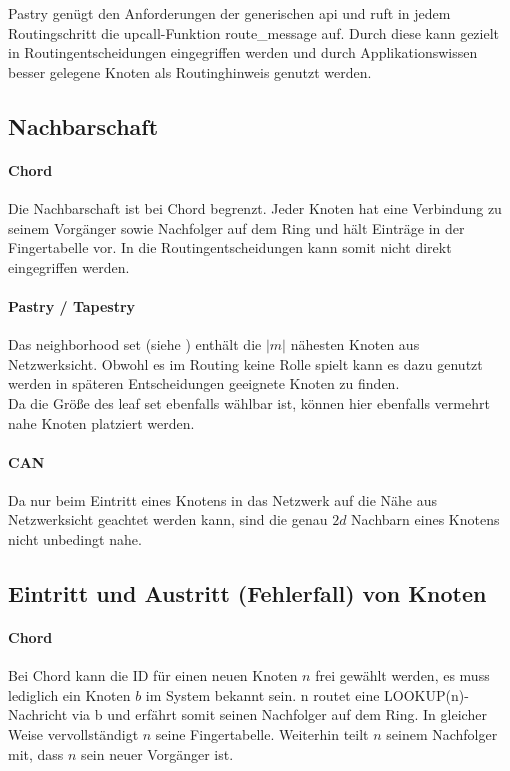 Pastry genügt den Anforderungen der generischen \ac{api} und ruft in jedem Routingschritt die upcall-Funktion route\_message auf. Durch diese kann gezielt in Routingentscheidungen eingegriffen werden und durch Applikationswissen besser gelegene Knoten als Routinghinweis genutzt werden.

\subsection{Nachbarschaft}
\paragraph{Chord}
Die Nachbarschaft ist bei Chord begrenzt. Jeder Knoten hat eine Verbindung zu seinem Vorgänger sowie Nachfolger auf dem Ring und hält Einträge in der Fingertabelle vor. In die Routingentscheidungen kann somit nicht direkt eingegriffen werden.


\paragraph{Pastry / Tapestry}
Das neighborhood set (siehe ) enthält die $|m|$ nähesten Knoten aus Netzwerksicht. Obwohl es im Routing keine Rolle spielt kann es dazu genutzt werden in späteren Entscheidungen geeignete Knoten zu finden.\\
Da die Größe des leaf set ebenfalls wählbar ist, können hier ebenfalls vermehrt nahe Knoten platziert werden.


\paragraph{CAN}
Da nur beim Eintritt eines Knotens in das Netzwerk auf die Nähe aus Netzwerksicht geachtet werden kann, sind die genau $2d$ Nachbarn eines Knotens nicht unbedingt nahe.

\subsection{Eintritt und Austritt (Fehlerfall) von Knoten}
\paragraph{Chord}
Bei Chord kann die ID für einen neuen Knoten $n$ frei gewählt werden, es muss lediglich ein Knoten $b$ im System bekannt sein. n routet eine LOOKUP(n)-Nachricht via b und erfährt somit seinen Nachfolger auf dem Ring. In gleicher Weise vervollständigt $n$ seine Fingertabelle. Weiterhin teilt $n$ seinem Nachfolger mit, dass $n$ sein neuer Vorgänger ist.

